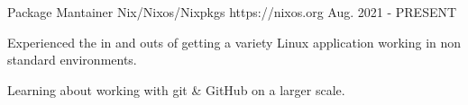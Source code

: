 
\begin{cventries}

  \cventry
    {Package Mantainer} %
    {Nix/Nixos/Nixpkgs} %
    {https://nixos.org} %
    {Aug. 2021 - PRESENT} %
    {
      \begin{cvitems} %
        \item {Experienced the in and outs of getting a variety Linux application working in non standard environments.}
        \item {Learning about working with git \& GitHub on a larger scale. }
      \end{cvitems}
    }

\end{cventries}
